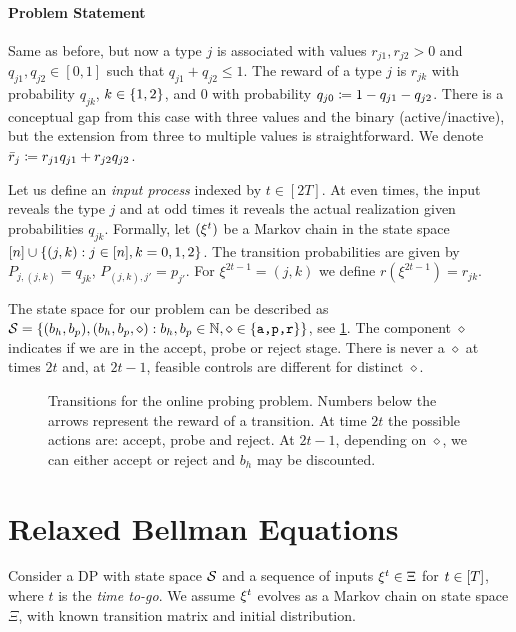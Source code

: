 \documentclass[letterpaper,11pt]{article}
\begin{document}
\paragraph{Problem Statement}
Same as before, but now a type $j$ is associated with values $r_{j1},r_{j2}>0$ and $q_{j1},q_{j2}\in[0,1]$ such that $q_{j1}+q_{j2}\leq 1$.
The reward of a type $j$ is $r_{jk}$ with probability $q_{jk}$, $k\in\crl{1,2}$, and $0$ with probability $q_{j0}\defeq1-q_{j1}-q_{j2}$.
There is a conceptual gap from this case with three values and the binary (active/inactive), but the extension from three to multiple values is straightforward.
We denote $\bar r_j\defeq r_{j1}q_{j1}+r_{j2}q_{j2}$.

Let us define an \emph{input process} indexed by $t\in[2T]$.
At even times, the input reveals the type $j$ and at odd times it reveals the actual realization given probabilities $q_{jk}$.
Formally, let $(\xit)$ be a Markov chain in the state space $[n]\cup\crl{(j,k):j\in[n],k=0,1,2}$.
The transition probabilities are given by $P_{j,(j,k)}=q_{jk}$, $P_{(j,k),j'}=p_{j'}$.
For $\xi^{2t-1}=(j,k)$ we define $r(\xi^{2t-1})=r_{jk}$.

The state space for our problem can be described as $\S=\crl{(b_h,b_p),(b_h,b_p,\diamond):b_h,b_p\in\N,\diamond\in \crl{\texttt{a,p,r}}}$, see \cref{fig:probing_states}.
The component $\diamond$ indicates if we are in the accept, probe or reject stage.
There is never a $\diamond$ at times $2t$ and, at $2t-1$, feasible controls are different for distinct $\diamond$.

\begin{figure}
\centering
\scalebox{0.9}{%

}
\caption{Transitions for the online probing problem. 
Numbers below the arrows represent the reward of a transition.
At time $2t$ the possible actions are: accept, probe and reject.
At $2t-1$, depending on $\diamond$, we can either accept or reject and $b_h$ may be discounted.
}
\label{fig:probing_states}
\end{figure}

\section{Relaxed Bellman Equations}

Consider a DP with state space $\S$ and a sequence of inputs $\xit\in\Xi$ for $t\in[\T]$, where $t$ is the \emph{time to-go}.
We assume $\xit$ evolves as a Markov chain on state space $\Xi$, with known transition matrix and initial distribution.
\end{document}
